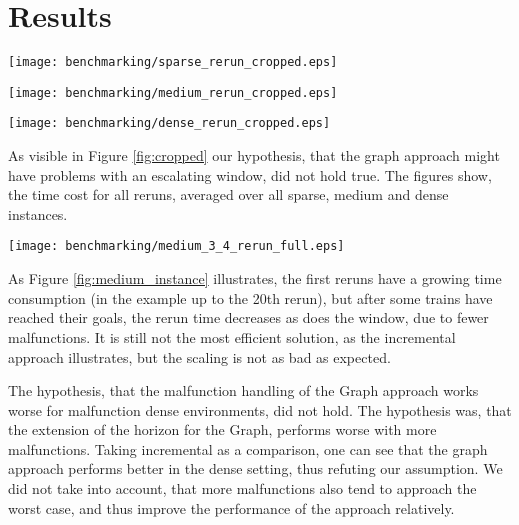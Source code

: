 \newpage
\section{Results}
\begin{figure*}[h]
    \begin{minipage}[t]{0.32\textwidth}
        \texttt{[image: benchmarking/sparse\_rerun\_cropped.eps]}
    \end{minipage}
    \begin{minipage}[t]{0.34\textwidth}
        \texttt{[image: benchmarking/medium\_rerun\_cropped.eps]}
    \end{minipage}
    \begin{minipage}[t]{0.32\textwidth}
        \texttt{[image: benchmarking/dense\_rerun\_cropped.eps]}
    \end{minipage}
    \caption{Time cost over rerun (from left to right sparse, medium, dense)}
    \label{fig:cropped}
\end{figure*}

As visible in Figure \ref{fig:cropped} our hypothesis, that the graph approach might have problems with an escalating window, did not hold true. The figures show, the time cost for all reruns, averaged over all sparse, medium and dense instances.

\begin{figure*}[h]
	\texttt{[image: benchmarking/medium\_3\_4\_rerun\_full.eps]}
	\caption{A singular medium Instance with 3\% Malfunction}
	\label{fig:medium_instance}
\end{figure*}


As Figure \ref{fig:medium_instance} illustrates, the first reruns have a growing time consumption (in the example up to the 20th rerun), but after some trains have reached their goals, the rerun time decreases as does the window, due to fewer malfunctions. It is still not the most efficient solution, as the incremental approach illustrates, but the scaling is not as bad as expected.

The hypothesis, that the malfunction handling of the Graph approach works worse for malfunction dense environments, did not hold. The hypothesis was, that the extension of the horizon for the Graph, performs worse with more malfunctions. Taking incremental as a comparison, one can see that the graph approach performs better in the dense setting, thus refuting our assumption. We did not take into account, that more malfunctions also tend to approach the worst case, and thus improve the performance of the approach relatively.

